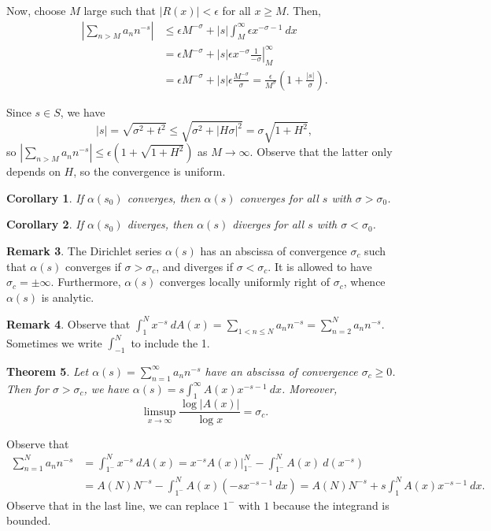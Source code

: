 \documentclass[11pt]{article}
\newtheorem{thm}{Theorem}[subsection]
\newtheorem{cor}[thm]{Corollary}
\theoremstyle{definition}
\newtheorem{remark}[thm]{Remark}
\newcommand{\s}[0]{\sigma}
\newcommand{\abs}[1]{\left\lvert#1\right\rvert} %
\begin{document}
Now, choose $M$ large such that $\abs{R(x)}<\epsilon$ for all $x\ge M$. Then,
\begin{align*}
  \abs{\sum_{n>M}a_nn^{-s}}
  &\le \epsilon M^{-\sigma} + \abs{s}\int_M^\infty \epsilon x^{-\sigma-1} ~dx \\
  &= \epsilon M^{-\s} + \left.\abs{s}\epsilon x^{-\s} \frac1{-\s} \right|_M^\infty \\
  &= \epsilon M^{-\s} + \abs{s} \epsilon \frac{M^{-\s}}{\s}
  = \frac{\epsilon}{M^\s} \left(1 + \frac{\abs{s}}{\s}\right) .
\end{align*}

Since $s\in S$, we have
\[
  \abs{s} = \sqrt{\s^2+t^2} \le \sqrt{\s^2 + \abs{H\s}^2} = \s\sqrt{1+H^2} ,
\]
so $\abs{\sum_{n>M}a_nn^{-s}} \le \epsilon(1+\sqrt{1+H^2})$ as $M\to\infty$. Observe that
the latter only depends on $H$, so the convergence is uniform.
\qedhere

\begin{cor}
If $\alpha(s_0)$ converges, then $\alpha(s)$ converges for all $s$ with $\sigma>\sigma_0$.
\end{cor}

\begin{cor}
If $\alpha(s_0)$ diverges, then $\alpha(s)$ diverges for all $s$ with $\sigma<\sigma_0$.
\end{cor}

\begin{remark}
The Dirichlet series $\alpha(s)$ has an abscissa of convergence $\sigma_c$ such that
$\alpha(s)$ converges if $\sigma>\sigma_c$, and diverges if $\sigma<\sigma_c$. It is
allowed to have $\sigma_c=\pm\infty$. Furthermore, $\alpha(s)$ converges locally uniformly
right of $\sigma_c$, whence $\alpha(s)$ is analytic.
\end{remark}

\begin{remark}
Observe that $\int_1^N x^{-s} ~dA(x) = \sum_{1<n\le N}a_nn^{-s} = \sum_{n=2}^Na_nn^{-s}$.
Sometimes we write $\int_{-1}^N$ to include the 1.
\end{remark}

\begin{thm}
Let $\alpha(s)=\sum_{n=1}^\infty a_nn^{-s}$ have an abscissa of convergence $\s_c\ge0$.
Then for $\s>\s_c$, we have $\alpha(s)=s\int_1^\infty A(x)x^{-s-1} ~dx$.
Moreover,
\[
  \limsup_{x\to\infty} \frac{\log\abs{A(x)}}{\log x} = \s_c .
\]
\end{thm}

\proof
Observe that
\begin{align*}
  \sum_{n=1}^N a_nn^{-s} &= \int_{1^-}^N x^{-s} ~dA(x)
  = \left.x^{-s}A(x)\right|_{1^-}^N - \int_{1^-}^N A(x) ~d(x^{-s}) \\
  &= A(N)N^{-s} - \int_{1^-}^N A(x)(-sx^{-s-1} ~dx)
  = A(N)N^{-s} + s\int_1^N A(x) x^{-s-1} ~dx .
\end{align*}
Observe that in the last line, we can replace $1^-$ with $1$ because the integrand is
bounded.
\end{document}
